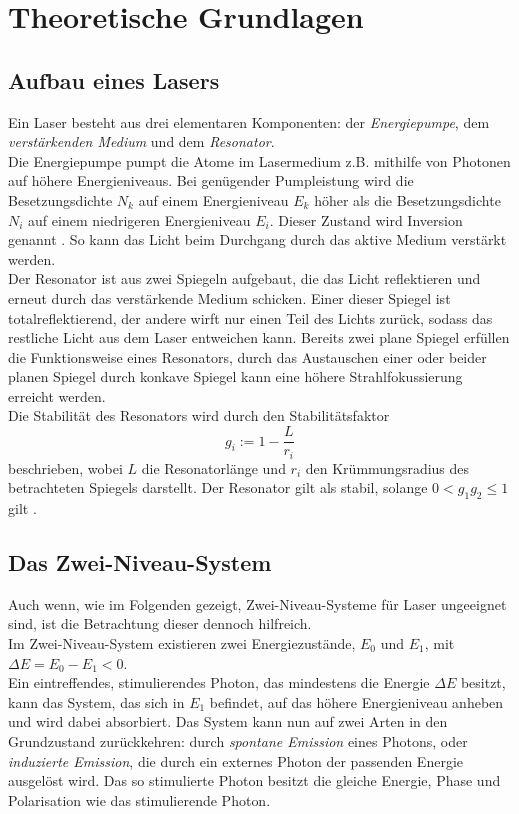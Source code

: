 \section{Theoretische Grundlagen}
\label{sec:theorie}

\subsection{Aufbau eines Lasers}

Ein Laser besteht aus drei elementaren Komponenten: der \textit{Energiepumpe}, dem \textit{verstärkenden Medium} und dem \textit{Resonator}. \\
Die Energiepumpe pumpt die Atome im Lasermedium z.B. mithilfe von Photonen auf höhere Energieniveaus. 
Bei genügender Pumpleistung wird die Besetzungsdichte $N_k$ auf einem Energieniveau $E_k$ höher als die Besetzungsdichte $N_i$ auf einem niedrigeren Energieniveau $E_i$.
Dieser Zustand wird Inversion genannt \cite{dem01}.
So kann das Licht beim Durchgang durch das aktive Medium verstärkt werden. \\

Der Resonator ist aus zwei Spiegeln aufgebaut, die das Licht reflektieren und erneut durch das verstärkende Medium schicken.
Einer dieser Spiegel ist totalreflektierend, der andere wirft nur einen Teil des Lichts zurück, sodass das restliche Licht aus dem Laser entweichen kann.
Bereits zwei plane Spiegel erfüllen die Funktionsweise eines Resonators, durch das Austauschen einer oder beider planen Spiegel durch konkave Spiegel kann eine höhere Strahlfokussierung erreicht werden. \\
Die Stabilität des Resonators wird durch den Stabilitätsfaktor
\begin{equation}
    g_i := 1 - \frac{L}{r_i} 
\end{equation}
beschrieben, wobei $L$ die Resonatorlänge und $r_i$ den Krümmungsradius des betrachteten Spiegels darstellt.
Der Resonator gilt als stabil, solange $0 < g_1 g_2 \leq 1$ gilt \cite{dem01}.

\subsection{Das Zwei-Niveau-System}
\label{subsec:2nivsys}

Auch wenn, wie im Folgenden gezeigt, Zwei-Niveau-Systeme für Laser ungeeignet sind, ist die Betrachtung dieser dennoch hilfreich. \\
Im Zwei-Niveau-System existieren zwei Energiezustände, $E_0$ und $E_1$, mit $\Delta E = E_0 - E_1 < 0$. \\
Ein eintreffendes, stimulierendes Photon, das mindestens die Energie $\Delta E$ besitzt, kann das System, das sich in $E_1$ befindet, auf das höhere Energieniveau anheben und wird dabei absorbiert.
Das System kann nun auf zwei Arten in den Grundzustand zurückkehren: durch \textit{spontane Emission} eines Photons, oder \textit{induzierte Emission}, die durch ein externes Photon der passenden Energie ausgelöst wird.
Das so stimulierte Photon besitzt die gleiche Energie, Phase und Polarisation wie das stimulierende Photon. \\

